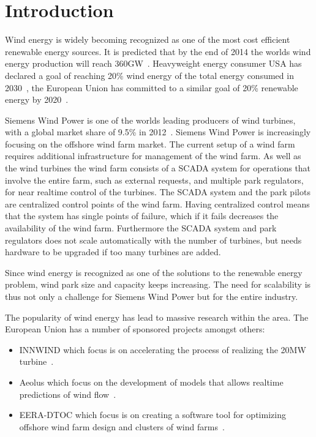 \chapter{Introduction}
\label{chap:intro}

Wind energy is widely becoming recognized as one of the most cost efficient renewable energy sources.
It is predicted that by the end of 2014 the worlds wind energy production will reach 360GW~\cite{worldwidewindcapacity}.
Heavyweight energy consumer USA has declared a goal of reaching 20\% wind energy of the total energy consumed in 2030~\cite{20percentenergy}, the European Union has committed to a similar goal of 20\% renewable energy by 2020~\cite{directive2009}.

Siemens Wind Power is one of the worlds leading producers of wind turbines, with a global market share of 9.5\% in 2012~\cite{worldmarketupdate2012}.
Siemens Wind Power is increasingly focusing on the offshore wind farm market.
The current setup of a wind farm requires additional infrastructure for management of the wind farm.
As well as the wind turbines the wind farm consists of a SCADA system for operations that involve the entire farm, such as external requests, and multiple park regulators, for near realtime control of the turbines.
The SCADA system and the park pilots are centralized control points of the wind farm. Having centralized control means that the system has single points of failure, which if it fails decreases the availability of the wind farm.
Furthermore the SCADA system and park regulators does not scale automatically with the number of turbines, but needs hardware to be upgraded if too many turbines are added.

Since wind energy is recognized as one of the solutions to the renewable energy problem, wind park size and capacity keeps increasing.
The need for scalability is thus not only a challenge for Siemens Wind Power but for the entire industry.

The popularity of wind energy has lead to massive research within the area. The European Union has a number of sponsored projects amongst others:
\begin{itemize}
	\item INNWIND which focus is on accelerating the process of realizing the 20MW turbine~\cite{INNWIND}.
	\item Aeolus which focus on the development of models that allows realtime predictions of wind flow~\cite{Aoelus}.
	\item EERA-DTOC which focus is on creating a software tool for optimizing offshore wind farm design and clusters of wind farms~\cite{eera-dtoc}.
\end{itemize}

